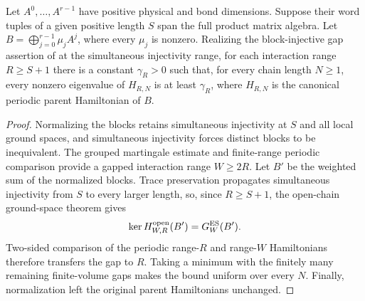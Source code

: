 \begin{lemma}
    \label{thm:block-parent-uniform-gap-simultaneous-injectivity}
    \leanok
    Let $A^0,\ldots,A^{r-1}$ have positive physical and bond dimensions.
    Suppose their word tuples of a given positive length $S$ span the full
    product matrix algebra. Let $B=\bigoplus_{j=0}^{r-1}\mu_jA^j$, where every
    $\mu_j$ is nonzero. Realizing the block-injective gap assertion of
    \cite[Section~IV.C]{Cirac2021Matrix} at the simultaneous injectivity range,
    for each interaction range $R\geq S+1$ there is a constant $\gamma_R>0$
    such that, for every chain length $N\geq1$, every nonzero eigenvalue of
    $H_{R,N}$ is at least $\gamma_R$, where $H_{R,N}$ is the canonical
    periodic parent Hamiltonian of $B$.
\end{lemma}
\begin{proof}
    \leanok
    Normalizing the blocks retains simultaneous injectivity at $S$ and
    all local ground spaces, and simultaneous injectivity forces distinct
    blocks to be inequivalent. The grouped martingale estimate and finite-range
    periodic comparison provide a gapped interaction range $W\geq2R$.
    Let $B'$ be the weighted sum of the normalized blocks. Trace preservation
    propagates simultaneous injectivity from $S$ to every larger length, so,
    since $R\geq S+1$, the open-chain ground-space theorem gives
    \begin{align}
        \ker H^{\mathrm{open}}_{W,R}(B')=G_W^{\mathrm{ES}}(B').\notag
    \end{align}
    Two-sided comparison of the
    periodic range-$R$ and range-$W$ Hamiltonians therefore transfers the gap
    to $R$. Taking a minimum with the finitely many remaining finite-volume
    gaps makes the bound uniform over every $N$. Finally, normalization left
    the original parent Hamiltonians unchanged.
\end{proof}

